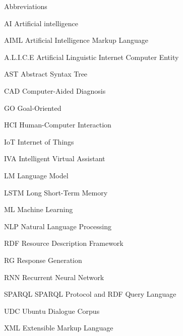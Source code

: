 \begin{dictionary}{Abbreviations}
\item[AI]			Artificial intelligence
\item[AIML]			Artificial Intelligence Markup Language
\item[A.L.I.C.E]	Artificial Linguistic Internet Computer Entity
\item[AST]			Abstract Syntax Tree
\item[CAD]			Computer-Aided Diagnosis
\item[GO]			Goal-Oriented
\item[HCI]			Human-Computer Interaction
\item[IoT]			Internet of Things
\item[IVA]			Intelligent Virtual Assistant
\item[LM]			Language Model
\item[LSTM]			Long Short-Term Memory
\item[ML]			Machine Learning
\item[NLP]			Natural Language Processing
\item[RDF]			Resource Description Framework
\item[RG]			Response Generation
\item[RNN]			Recurrent Neural Network
\item[SPARQL]		SPARQL Protocol and RDF Query Language
\item[UDC]			Ubuntu Dialogue Corpus
\item[XML]			Extensible Markup Language

\end{dictionary}